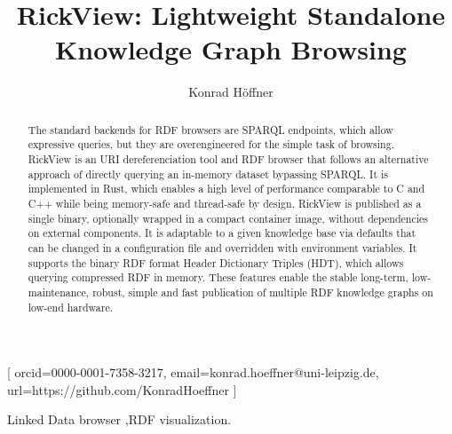 \documentclass{ceurart}
\begin{document}
\title{RickView: Lightweight Standalone Knowledge Graph Browsing}
\author[1]{Konrad Höffner}[%
orcid=0000-0001-7358-3217,
email=konrad.hoeffner@uni-leipzig.de,
url=https://github.com/KonradHoeffner
]
\cormark[1]
\fnmark[1]
\address[1]{Institute for Medical Informatics, Statistics and Epidemiology (IMISE), Leipzig University, Leipzig, Germany}


\begin{abstract}
The standard backends for RDF browsers are SPARQL endpoints, which allow expressive queries, but they are overengineered for the simple task of browsing.
RickView is an URI dereferenciation tool and RDF browser that follows an alternative approach of directly querying an in-memory dataset bypassing SPARQL.
It is implemented in Rust, which enables a high level of performance comparable to C and C++ while being memory-safe and thread-safe by design.
RickView is published as a single binary, optionally wrapped in a compact container image, without dependencies on external components.
It is adaptable to a given knowledge base via defaults that can be changed in a configuration file and overridden with environment variables.
It supports the binary RDF format Header Dictionary Triples (HDT), which allows querying compressed RDF in memory.
These features enable the stable long-term, low-maintenance, robust, simple and fast publication of multiple RDF knowledge graphs on low-end hardware.
\end{abstract}
\begin{keywords}Linked Data browser \sep RDF visualization.\end{keywords}

\maketitle
\end{document}
